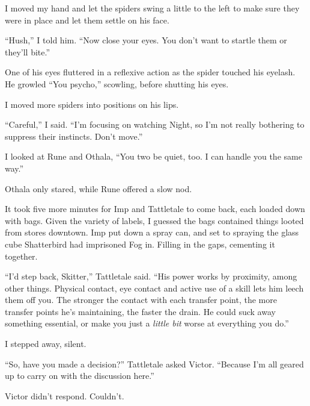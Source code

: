 I moved my hand and let the spiders swing a little to the left to make sure they were in place and let them settle on his face.



``Hush,'' I told him.  ``Now close your eyes.  You don't want to startle them or they'll bite.''



One of his eyes fluttered in a reflexive action as the spider touched his eyelash.  He growled ``You psycho,'' scowling, before shutting his eyes.



I moved more spiders into positions on his lips.



``Careful,'' I said.  ``I'm focusing on watching Night, so I'm not really bothering to suppress their instincts.  Don't move.''



I looked at Rune and Othala, ``You two be quiet, too.  I can handle you the same way.''



Othala only stared, while Rune offered a slow nod.



It took five more minutes for Imp and Tattletale to come back, each loaded down with bags.  Given the variety of labels, I guessed the bags contained things looted from stores downtown.  Imp put down a spray can, and set to spraying the glass cube Shatterbird had imprisoned Fog in.  Filling in the gaps, cementing it together.



``I'd step back, Skitter,'' Tattletale said.  ``His power works by proximity, among other things.  Physical contact, eye contact and active use of a skill lets him leech them off you.  The stronger the contact with each transfer point, the more transfer points he's maintaining, the faster the drain.  He could suck away something essential, or make you just a \emph{little bit} worse at everything you do.''



I stepped away, silent.



``So, have you made a decision?'' Tattletale asked Victor.  ``Because I'm all geared up to carry on with the discussion here.''



Victor didn't respond.  Couldn't.



